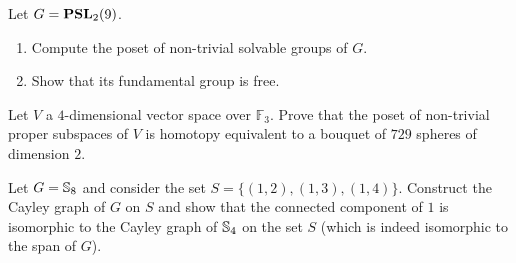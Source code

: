 \begin{prob}
Let $G = \mathbf{PSL}_2(9)$.
\begin{enumerate}%
    \item Compute the poset of non-trivial solvable groups of $G$.
    \item Show that its fundamental group is free.
\end{enumerate}
\end{prob}

\begin{prob}
Let $V$ a $4$-dimensional vector space over $\mathbb{F}_3$.
Prove that the poset of non-trivial proper subspaces of $V$ is homotopy equivalent to a bouquet of $729$ spheres of dimension $2$.
\end{prob}

\begin{prob}
Let $G = \mathbb{S}_8$ and consider the set $S = \{ (1,2), (1,3), (1,4) \}$.
Construct the Cayley graph of $G$ on $S$ and show that the connected component of $1$ is isomorphic to the Cayley graph of $\mathbb{S}_4$ on the set $S$ (which is indeed isomorphic to the span of $G$).
\end{prob}
